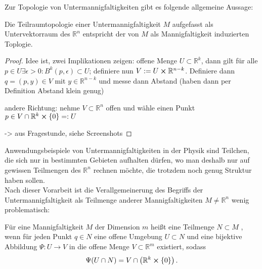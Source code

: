 \documentclass[../H_Analysis_main.tex]{subfiles}
\begin{document}
Zur Topologie von Untermannigfaltigkeiten gibt es folgende allgemeine Aussage:
\begin{lemma}
Die Teilraumtopologie einer Untermannigfaltigkeit $M$ aufgefasst als Untervektorraum des $\mathbb{R}^n$ entspricht der von $M$ als Mannigfaltigkeit induzierten Toplogie.
\end{lemma}
\begin{proof}
Idee ist, zwei Implikationen zeigen: offene Menge $U \subset \mathbb{R}^k$, dann gilt für alle $p \in U \exists \epsilon > 0: B^k(p, \epsilon) \subset U$; definiere nun $V := U \cross \mathbb{R}^{n-k}$. Definiere dann $q = (p, y) \in V$ mit $y \in \mathbb{R}^{n-k}$ und messe dann Abstand (haben dann per Definition Abstand klein genug)

andere Richtung: nehme $V \subset \mathbb{R}^n$ offen und wähle einen Punkt $p \in V \cap \mathbb{R}^k \cross \qty{0} =: U$

-> aus Fragestunde, siehe Screenshots
\end{proof}


Anwendungsbeispiele von Untermannigfaltigkeiten in der Physik sind Teilchen, die sich nur in bestimmten Gebieten aufhalten dürfen, wo man deshalb nur auf gewissen Teilmengen des $\mathbb{R}^n$ rechnen möchte, die trotzdem noch genug Struktur haben sollen.\\




Nach dieser Vorarbeit ist die Verallgemeinerung des Begriffs der Untermannigfaltigkeit als Teilmenge anderer Mannigfaltigkeiten $M \neq \mathbb{R}^n$ wenig problematisch:
\begin{defi}[Untermannigfaltigkeit V2]
Für eine Mannigfaltigkeit $M$ der Dimension $m$ heißt eine Teilmenge $N \subset M$ , wenn für jeden Punkt $q \in N$ eine offene Umgebung $U \subset N$ und eine bijektive Abbildung $\Psi: U \rightarrow V$ in die offene Menge $V \subset \mathbb{R}^m$ existiert, sodass
\begin{equation}
\Psi\qty(U \cap N) =V \cap \qty(\mathbb{R}^k \cross \qty{0}) \, .
\end{equation}
\end{defi}
\end{document}
